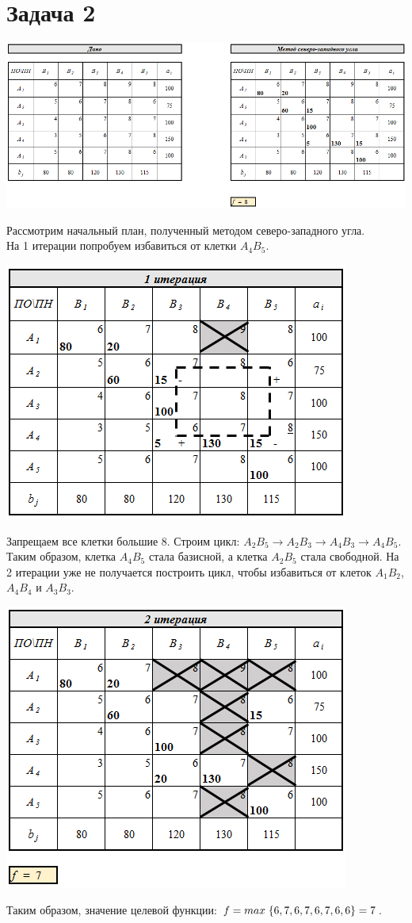 \documentclass[14pt,a4paper,fleqn]{extarticle}
\begin{document}
\section*{Задача 2}
\begin{center}
	\includegraphics[scale=0.51]{8}
\end{center}
Рассмотрим начальный план, полученный методом северо-западного угла.\\
На 1 итерации попробуем избавиться от клетки $A_4B_5$.
\begin{center}
	\includegraphics[scale=0.64]{9}
\end{center}
Запрещаем все клетки большие 8. Строим цикл: $A_2B_5 \rightarrow A_2B_3 \rightarrow A_4B_3 \rightarrow A_4B_5$.\\
Таким образом, клетка $A_4B_5$ стала базисной, а клетка $A_2B_5$ стала свободной.
\newpage
На 2 итерации уже не получается построить цикл, чтобы избавиться от клеток $A_1B_2$, $A_4B_4$ и $A_3B_3$.
\begin{center}
	\includegraphics[scale=0.64]{10}
\end{center}
Таким образом, значение целевой функции: $f = max \hspace*{0.1cm} \{6,7,6,7,6,7,6,6\} = 7$.
\end{document}

